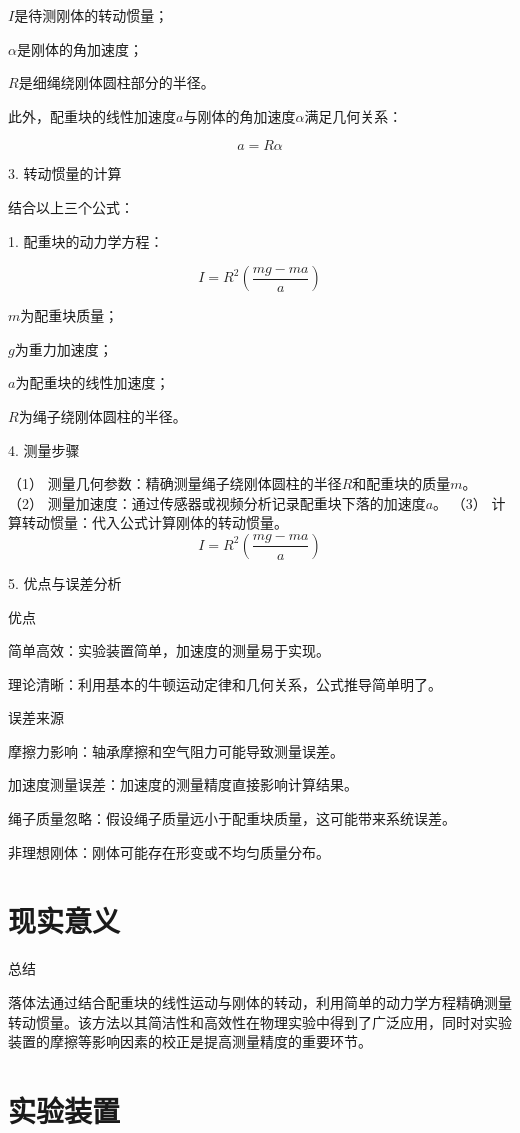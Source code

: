 \documentclass[12pt,hyperref,a4paper,UTF8]{ctexart}
\begin{document}
 $I$是待测刚体的转动惯量；

 $\alpha$是刚体的角加速度；

 $R$是细绳绕刚体圆柱部分的半径。


此外，配重块的线性加速度$a$与刚体的角加速度$\alpha$满足几何关系：

$$ a = R \alpha $$

3. 转动惯量的计算

结合以上三个公式：

1. 配重块的动力学方程：

$$ I = R^2 \left( \frac{m g - m a}{a} \right) $$

$m$为配重块质量；

$g$为重力加速度；

$a$为配重块的线性加速度；

$R$为绳子绕刚体圆柱的半径。


4. 测量步骤

（1） 测量几何参数：精确测量绳子绕刚体圆柱的半径$R$和配重块的质量$m$。
（2） 测量加速度：通过传感器或视频分析记录配重块下落的加速度$a$。
（3） 计算转动惯量：代入公式计算刚体的转动惯量。
$$ I=R^2(\frac{mg-ma}{a}) $$


5. 优点与误差分析

优点

简单高效：实验装置简单，加速度的测量易于实现。

理论清晰：利用基本的牛顿运动定律和几何关系，公式推导简单明了。


误差来源

摩擦力影响：轴承摩擦和空气阻力可能导致测量误差。

加速度测量误差：加速度的测量精度直接影响计算结果。

绳子质量忽略：假设绳子质量远小于配重块质量，这可能带来系统误差。

非理想刚体：刚体可能存在形变或不均匀质量分布。

\section{现实意义}

总结

落体法通过结合配重块的线性运动与刚体的转动，利用简单的动力学方程精确测量转动惯量。该方法以其简洁性和高效性在物理实验中得到了广泛应用，同时对实验装置的摩擦等影响因素的校正是提高测量精度的重要环节。


\section{实验装置}
\end{document}

